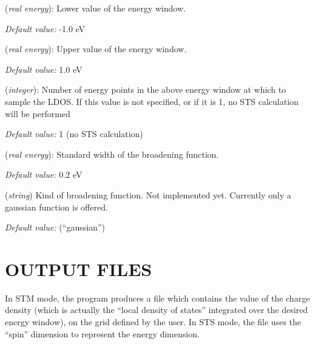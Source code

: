 \begin{description}
\itemsep 10pt
\parsep 0pt

\item[{\bf STM.Emin}] ({\it real energy}): 
Lower value of the energy window.

{\it Default value:} -1.0 eV

\item[{\bf STM.Emax}] ({\it real energy}): 
Upper value of the energy window.

{\it Default value:} 1.0 eV

\item[{\bf STS.NumberOfPoints}] ({\it integer}): 
  Number of energy points in the above energy window at which
  to sample the LDOS. If this value is not specified, or if it is 1,
  no STS calculation will be performed

  {\it Default value:} 1  (no STS calculation)

\item[{\bf STS.Broadening}] ({\it real energy}): 
  Standard width of the broadening function.

{\it Default value:} 0.2 eV
  
\item[{\bf STS.Broadener}] ({\it string})
  Kind of broadening function. Not implemented yet.
  Currently only a gaussian function is offered.

{\it Default value:} (``gaussian'')
  

\end{description}



\section{OUTPUT FILES}
\label{cap:output} 

In STM mode, the program produces a file which contains the value
of the charge density (which is actually the ``local density of
states'' integrated over the desired energy window), on the grid
defined by the user. In STS mode, the file uses the ``spin'' dimension
to represent the energy dimension.

